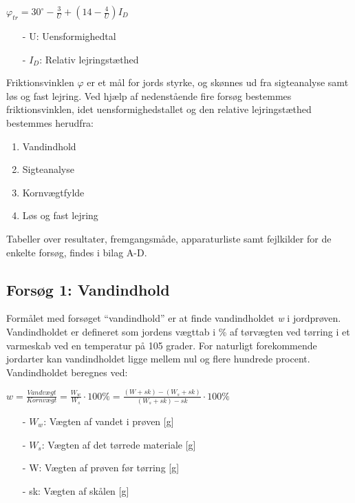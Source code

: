 \begin{center}
	$\varphi_{tr} = 30^\circ - \frac{3}{U} + (14 - \frac{4}{U}) I_D$
\end{center}

\begin{itemize}
	\item[-] U: Uensformighedtal
	\item[-] $I_D$: Relativ lejringstæthed
\end{itemize}

Friktionsvinklen $\varphi$ er et mål for jords styrke, og skønnes ud fra sigteanalyse samt løs og fast lejring. Ved hjælp af nedenstående fire forsøg bestemmes friktionsvinklen, idet uensformighedstallet og den relative lejringstæthed bestemmes herudfra: 
\begin{enumerate}
	\item Vandindhold
	\item Sigteanalyse
	\item Kornvægtfylde
	\item Løs og fast lejring
\end{enumerate}
Tabeller over resultater, fremgangsmåde, apparaturliste samt fejlkilder for de enkelte forsøg, findes i bilag A-D.

\subsection{Forsøg 1: Vandindhold}
Formålet med forsøget “vandindhold” er at finde vandindholdet \textit{w} i jordprøven. Vandindholdet er defineret som jordens vægttab i \% af tørvægten ved tørring i et varmeskab ved en temperatur på 105 grader. For naturligt forekommende jordarter kan vandindholdet ligge mellem nul og flere hundrede procent.
\newline
\newline
Vandindholdet beregnes ved:

\begin{center}
	$w = \frac{Vandvægt}{Kornvægt} = \frac{W_w}{W_s}\cdot 100\% = \frac{(W+sk)-(W_s+sk)}{(W_s+sk)-sk}\cdot 100\%$
\end{center}

\begin{itemize}
	\item[-] $W_w$: Vægten af vandet i prøven [g]
	\item[-] $W_s$: Vægten af det tørrede materiale [g]
	\item[-] W: Vægten af prøven før tørring [g]
	\item[-] sk: Vægten af skålen [g]
\end{itemize}

